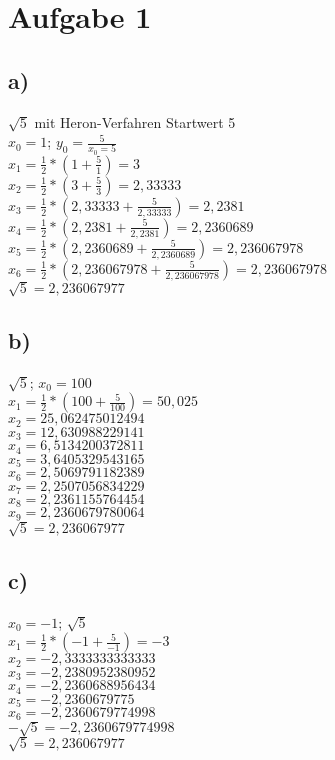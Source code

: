 \documentclass{article}
\begin{document}
	\section*{Aufgabe 1}
	\subsection*{a)}
	$\sqrt{5}$ mit Heron-Verfahren Startwert 5 \\
	$x_{0} = 1$; $y_{0} = \frac{5}{x_{0} = 5}$ \\
	$x_{1} = \frac{1}{2} * (1 + \frac{5}{1}) = 3$ \\
	$x_{2} = \frac{1}{2} * (3 + \frac{5}{3}) = 2,33333$ \\
	$x_{3} = \frac{1}{2}*(2,33333 + \frac{5}{2,33333}) = 2,2381$ \\
	$x_{4} = \frac{1}{2} * (2,2381 + \frac{5}{2,2381}) = 2,2360689$ \\
	$x_{5} = \frac{1}{2}*(2,2360689 + \frac{5}{2,2360689}) = 2,236067978$ \\
	$x_{6} = \frac{1}{2}*(2,236067978 + \frac{5}{2,236067978}) = 2,236067978$ \\
	$\sqrt{5} = 2,236067977$
	\subsection*{b)}
	$\sqrt{5}$; $x_{0} = 100$ \\
	$x_{1} = \frac{1}{2} * (100 + \frac{5}{100}) = 50,025$ \\
	$x_{2} = 25,062475012494$ \\
	$x_{3} = 12,630988229141$ \\
	$x_{4} = 6,5134200372811$ \\
	$x_{5} = 3,6405329543165$ \\
	$x_{6} = 2,5069791182389$ \\
	$x_{7} = 2,2507056834229$ \\
	$x_{8} = 2,2361155764454$ \\
	$x_{9} = 2,2360679780064$ \\
	$\sqrt{5} = 2,236067977$
	\subsection*{c)}
	$x_{0} = -1$; $\sqrt{5}$ \\
	$x_{1} = \frac{1}{2} * (-1 + \frac{5}{-1}) = -3$ \\
	$x_{2} = -2,3333333333333$ \\
	$x_{3} = -2,2380952380952$ \\
	$x_{4} = -2,2360688956434$ \\
	$x_{5} = -2,2360679775$ \\
	$x_{6} = -2,2360679774998$ \\
	$-\sqrt{5} = -2,2360679774998$ \\
	$\sqrt{5} = 2,236067977$
\end{document}
